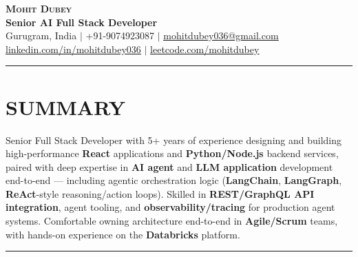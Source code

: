 \documentclass[100pt,a4paper]{article}
\newcommand{\sectionline}{
\begin{center}
\vspace{-10pt}
\rule{1\textwidth}{0.5pt}
\end{center}
\vspace{1pt}
}
\begin{document}
\begin{center}
    \textbf{\Huge \scshape Mohit Dubey} \\ \vspace{4pt}
    \textbf{Senior AI Full Stack Developer} \\ \vspace{6pt}
    \small Gurugram, India $|$ +91-9074923087 $|$ \href{mailto:mohitdubey036@gmail.com}{\underline{mohitdubey036@gmail.com}} \\
    \href{https://www.linkedin.com/in/mohit-dubey-036/}{\underline{linkedin.com/in/mohitdubey036}} $|$ \href{https://leetcode.com/u/mohitdubey036/}
    {\underline{leetcode.com/mohitdubey}}
\end{center}

\sectionline
\section*{SUMMARY}
Senior Full Stack Developer with 5+ years of experience designing and building high-performance \textbf{React} applications and \textbf{Python/Node.js} backend services, paired with deep expertise in \textbf{AI agent} and \textbf{LLM application} development end-to-end — including agentic orchestration logic (\textbf{LangChain}, \textbf{LangGraph}, \textbf{ReAct}-style reasoning/action loops). Skilled in \textbf{REST/GraphQL API integration}, agent tooling, and \textbf{observability/tracing} for production agent systems. Comfortable owning architecture end-to-end in \textbf{Agile/Scrum} teams, with hands-on experience on the \textbf{Databricks} platform.

\sectionline
\end{document}
